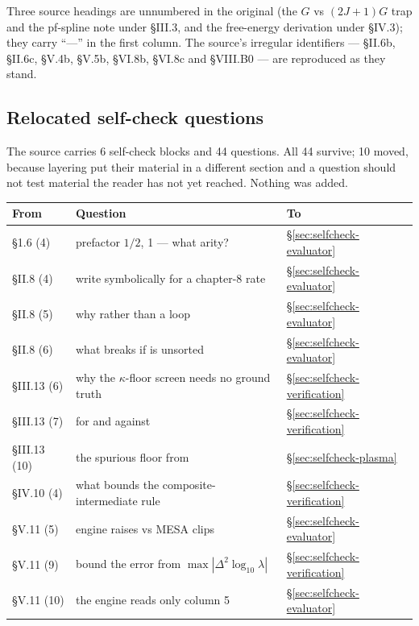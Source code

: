 \begin{aside}
Three source headings are unnumbered in the original (the $G$ vs $(2J{+}1)G$
trap and the pf-spline note under \S III.3, and the free-energy derivation under
\S IV.3); they carry ``---'' in the first column. The source's irregular
identifiers --- \S II.6b, \S II.6c, \S V.4b, \S V.5b, \S VI.8b, \S VI.8c and
\S VIII.B0 --- are reproduced as they stand.
\end{aside}

\subsection{Relocated self-check questions}
\label{app:selfcheck}

The source carries 6 self-check blocks and 44 questions. All 44 survive; 10
moved, because layering put their material in a different section and a question
should not test material the reader has not yet reached. Nothing was added.

\begin{center}
\begin{tabularx}{\textwidth}{@{}L{2.1cm} Y L{3.4cm}@{}}
\toprule
\textbf{From} & \textbf{Question} & \textbf{To} \\
\midrule
\S 1.6 (4) & prefactor $1/2$,  1 --- what arity? &
  \S\ref{sec:selfcheck-evaluator} \\
\S II.8 (4) & write  symbolically for a chapter-8 rate &
  \S\ref{sec:selfcheck-evaluator} \\
\S II.8 (5) & why  rather than a loop &
  \S\ref{sec:selfcheck-evaluator} \\
\S II.8 (6) & what breaks if  is unsorted &
  \S\ref{sec:selfcheck-evaluator} \\
\S III.13 (6) & why the $\kappa$-floor screen needs no ground truth &
  \S\ref{sec:selfcheck-verification} \\
\S III.13 (7) & for and against  &
  \S\ref{sec:selfcheck-verification} \\
\S III.13 (10) & the spurious floor from  &
  \S\ref{sec:selfcheck-plasma} \\
\S IV.10 (4) & what bounds the composite-intermediate rule &
  \S\ref{sec:selfcheck-verification} \\
\S V.11 (5) & engine raises vs MESA clips &
  \S\ref{sec:selfcheck-evaluator} \\
\S V.11 (9) & bound the error from $\max|\Delta^2\log_{10}\lambda|$ &
  \S\ref{sec:selfcheck-verification} \\
\S V.11 (10) & the engine reads only column 5 &
  \S\ref{sec:selfcheck-evaluator} \\
\bottomrule
\end{tabularx}
\end{center}

